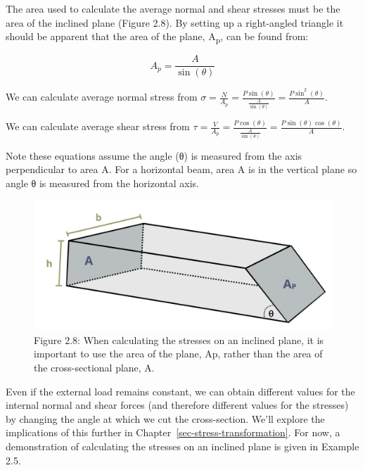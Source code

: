 \documentclass[
  letterpaper,
  DIV=11,
  numbers=noendperiod]{scrreprt}
\begin{document}
The area used to calculate the average normal and shear stresses must be
the area of the inclined plane (Figure 2.8). By setting up a
right-angled triangle it should be apparent that the area of the plane,
A\textsubscript{p}, can be found from:

\[
A_p=\frac{A}{\sin (\theta)}
\]

We can calculate average normal stress from
\(\sigma=\frac{N}{A_p}=\frac{P \sin (\theta)}{\frac{A}{\sin (\theta)}}=\frac{P \sin ^2(\theta)}{A}\).

We can calculate average shear stress from
\(\tau=\frac{V}{A_p}=\frac{P \cos (\theta)}{\frac{A}{\sin (\theta)}}=\frac{P \sin (\theta) \cos (\theta)}{A}\).

Note these equations assume the angle (θ) is measured from the axis
perpendicular to area A. For a horizontal beam, area A is in the
vertical plane so angle θ is measured from the horizontal axis.

\begin{figure}[H]

{\centering \includegraphics{images/CH2 figures/2.8.png}

}

\caption{Figure 2.8: When calculating the stresses on an inclined plane,
it is important to use the area of the plane, Ap, rather than the area
of the cross-sectional plane, A.}

\end{figure}%

Even if the external load remains constant, we can obtain different
values for the internal normal and shear forces (and therefore different
values for the stresses) by changing the angle at which we cut the
cross-section. We'll explore the implications of this further in
Chapter~\ref{sec-stress-transformation}. For now, a demonstration of
calculating the stresses on an inclined plane is given in Example 2.5.
\end{document}
